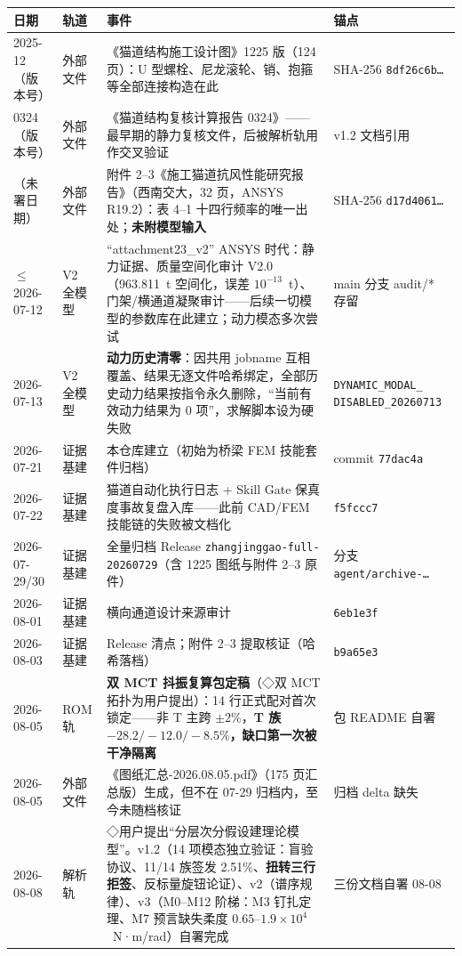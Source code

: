 \documentclass[11pt,a4paper]{ctexart}
\begin{document}
\begin{longtable}{@{}p{2.1cm}p{2.2cm}p{7.2cm}p{3.4cm}@{}}
\toprule
日期 & 轨道 & 事件 & 锚点 \\
\midrule
\endhead
2025-12（版本号） & 外部文件 & 《猫道结构施工设计图》1225 版（124 页）：U 型螺栓、尼龙滚轮、销、抱箍等全部连接构造在此 & SHA-256 \texttt{8df26c6b\ldots} \\
0324（版本号） & 外部文件 & 《猫道结构复核计算报告 0324》——最早期的静力复核文件，后被解析轨用作交叉验证 & v1.2 文档引用 \\
（未署日期） & 外部文件 & 附件 2--3《施工猫道抗风性能研究报告》（西南交大，32 页，ANSYS R19.2）：表 4--1 十四行频率的唯一出处；\textbf{未附模型输入} & SHA-256 \texttt{d17d4061\ldots} \\
$\le$2026-07-12 & V2 全模型 & ``attachment23\_v2'' ANSYS 时代：静力证据、质量空间化审计 V2.0（963.811~t 空间化，误差 $10^{-13}$~t）、门架/横通道凝聚审计——后续一切模型的参数库在此建立；动力模态多次尝试 & main 分支 audit/* 存留 \\
2026-07-13 & V2 全模型 & \textbf{动力历史清零}：因共用 jobname 互相覆盖、结果无逐文件哈希绑定，全部历史动力结果按指令永久删除，``当前有效动力结果为 0 项''，求解脚本设为硬失败 & \texttt{DYNAMIC\_MODAL\_} \newline \texttt{DISABLED\_20260713} \\
2026-07-21 & 证据基建 & 本仓库建立（初始为桥梁 FEM 技能套件归档） & commit \texttt{77dac4a} \\
2026-07-22 & 证据基建 & 猫道自动化执行日志 + Skill Gate 保真度事故复盘入库——此前 CAD/FEM 技能链的失败被文档化 & \texttt{f5fccc7} \\
2026-07-29/30 & 证据基建 & 全量归档 Release \texttt{zhangjinggao-full-20260729}（含 1225 图纸与附件 2--3 原件） & 分支 \texttt{agent/archive-\ldots} \\
2026-08-01 & 证据基建 & 横向通道设计来源审计 & \texttt{6eb1e3f} \\
2026-08-03 & 证据基建 & Release 清点；附件 2--3 提取核证（哈希落档） & \texttt{b9a65e3} \\
2026-08-05 & ROM 轨 & \textbf{双 MCT 抖振复算包定稿}（◇双 MCT 拓扑为用户提出）：14 行正式配对首次锁定——非 T 主跨 $\pm2\%$，\textbf{T 族 $-28.2/-12.0/-8.5\%$，缺口第一次被干净隔离} & 包 README 自署 \\
2026-08-05 & 外部文件 & 《图纸汇总-2026.08.05.pdf》（175 页汇总版）生成，但不在 07-29 归档内，至今未随档核证 & 归档 delta 缺失 \\
2026-08-08 & 解析轨 & ◇用户提出``分层次分假设建理论模型''。v1.2（14 项模态独立验证：盲验协议、11/14 族签发 2.51\%、\textbf{扭转三行拒签}、反标量旋钮论证）、v2（谱序规律）、v3（M0--M12 阶梯：M3 钉扎定理、M7 预言缺失柔度 $0.65$--$1.9\times10^4$~N·m/rad）自署完成 & 三份文档自署 08-08 \\

\end{longtable}
\end{document}
